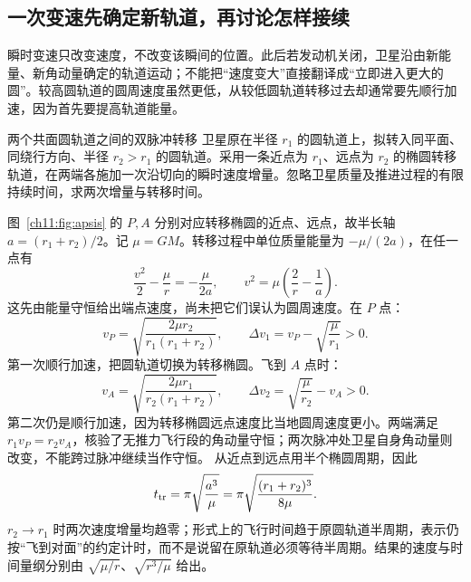 \subsection{一次变速先确定新轨道，再讨论怎样接续}
瞬时变速只改变速度，不改变该瞬间的位置。此后若发动机关闭，卫星沿由新能量、新角动量确定的轨道运动；不能把“速度变大”直接翻译成“立即进入更大的圆”。较高圆轨道的圆周速度虽然更低，从较低圆轨道转移过去却通常要先顺行加速，因为首先要提高轨道能量。

\begin{origexamplebox}{两个共面圆轨道之间的双脉冲转移}\label{ch11:ex:teaching-transfer}
卫星原在半径 $r_1$ 的圆轨道上，拟转入同平面、同绕行方向、半径 $r_2>r_1$ 的圆轨道。采用一条近点为 $r_1$、远点为 $r_2$ 的椭圆转移轨道，在两端各施加一次沿切向的瞬时速度增量。忽略卫星质量及推进过程的有限持续时间，求两次增量与转移时间。
\end{origexamplebox}
\begin{xesolution}
图~\ref{ch11:fig:apsis} 的 $P,A$ 分别对应转移椭圆的近点、远点，故半长轴 $a=(r_1+r_2)/2$。记 $\mu=GM$。转移过程中单位质量能量为 $-\mu/(2a)$，在任一点有
\[
 \frac{v^2}{2}-\frac\mu r=-\frac\mu{2a},
 \qquad v^2=\mu\left(\frac2r-\frac1a\right).
\]
这先由能量守恒给出端点速度，尚未把它们误认为圆周速度。在 $P$ 点：
\[
 v_P=\sqrt{\frac{2\mu r_2}{r_1(r_1+r_2)}},\qquad
 \Delta v_1=v_P-\sqrt{\frac\mu{r_1}}>0.
\]
第一次顺行加速，把圆轨道切换为转移椭圆。飞到 $A$ 点时：
\[
 v_A=\sqrt{\frac{2\mu r_1}{r_2(r_1+r_2)}},\qquad
 \Delta v_2=\sqrt{\frac\mu{r_2}}-v_A>0.
\]
第二次仍是顺行加速，因为转移椭圆远点速度比当地圆周速度更小。两端满足 $r_1v_P=r_2v_A$，核验了无推力飞行段的角动量守恒；两次脉冲处卫星自身角动量则改变，不能跨过脉冲继续当作守恒。
从近点到远点用半个椭圆周期，因此
\[
 t_{\rm tr}=\pi\sqrt{\frac{a^3}{\mu}}
 =\pi\sqrt{\frac{(r_1+r_2)^3}{8\mu}}.
\]
$r_2\to r_1$ 时两次速度增量均趋零；形式上的飞行时间趋于原圆轨道半周期，表示仍按“飞到对面”的约定计时，而不是说留在原轨道必须等待半周期。结果的速度与时间量纲分别由 $\sqrt{\mu/r}$、$\sqrt{r^3/\mu}$ 给出。
\end{xesolution}
